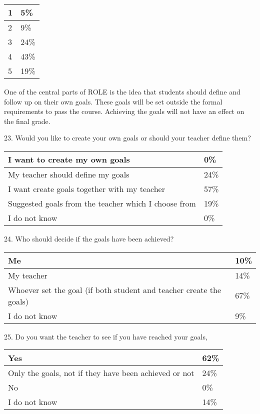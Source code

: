 \begin{center}
    \begin{tabular}{ | l | l | }
    \hline
    1 & 5\% \\ \hline
	2 & 9\% \\ \hline
	3 & 24\% \\ \hline
	4 & 43\% \\ \hline
	5 & 19\% \\ \hline
    \end{tabular}
\end{center}

One of the central parts of ROLE is the idea that students should define and follow up on their own goals. These goals will be set outside the formal requirements to pass the course. Achieving the goals will not have an effect on the final grade.

23. Would you like to create your own goals or should your teacher define them?

\begin{center}
    \begin{tabular}{ | l | l | }
    \hline
    I want to create my own goals & 0\% \\ \hline
	My teacher should define my goals & 24\% \\ \hline
	I want create goals together with my teacher & 57\% \\ \hline
	Suggested goals from the teacher which I choose from & 19\% \\ \hline
	I do not know & 0\% \\ \hline
    \end{tabular}
\end{center}

24. Who should decide if the goals have been achieved?

\begin{center}
    \begin{tabular}{ | l | l | }
    \hline
    Me & 10\% \\ \hline
	My teacher & 14\% \\ \hline
	Whoever set the goal (if both student and teacher create the goals) & 67\% \\ \hline
	I do not know & 9\% \\ \hline
    \end{tabular}
\end{center}

25. Do you want the teacher to see if you have reached your goals,

\begin{center}
    \begin{tabular}{ | l | l | }
    \hline
    Yes & 62\% \\ \hline
	Only the goals, not if they have been achieved or not & 24\% \\ \hline
	No & 0\% \\ \hline
	I do not know & 14\% \\ \hline
    \end{tabular}
\end{center}

